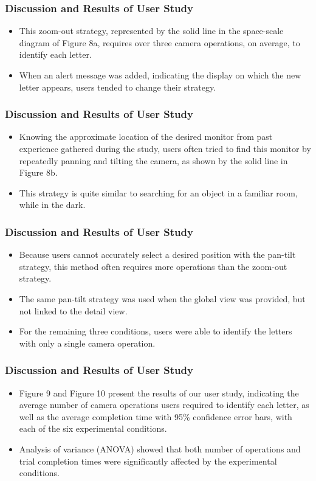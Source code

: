 \documentclass{beamer}
\begin{document}
\begin{frame}
\frametitle{Discussion and Results of User Study}

\begin{itemize}
\item This zoom-out strategy, represented by the solid line in the space-scale diagram  of Figure 8a, requires over three camera operations, on average, to identify each letter.
\item When an alert message was added, indicating the display on which the new letter appears, users tended to change their strategy.
\end{itemize}

\end{frame}

\begin{frame}
\frametitle{Discussion and Results of User Study}

\begin{itemize}
\item Knowing the approximate location of the desired monitor from past experience gathered during the study, users often tried to find this monitor by repeatedly panning and tilting the camera, as shown by the solid line in Figure 8b.
\item This strategy is quite similar to searching for an object in a familiar room, while in the dark.
\end{itemize}

\end{frame}

\begin{frame}
\frametitle{Discussion and Results of User Study}

\begin{itemize}
\item Because users cannot accurately select a desired position with the pan-tilt strategy, this method often requires more operations than the zoom-out strategy.
\item The same pan-tilt strategy was used when the global view was provided, but not linked to the detail view.
\item For the remaining three conditions, users were able to identify the letters with only a single camera operation.
\end{itemize}

\end{frame}

\begin{frame}
\frametitle{Discussion and Results of User Study}

\begin{itemize}
\item Figure 9 and Figure 10 present the results of our user study, indicating the average number of camera operations users required to identify each letter, as well as the average completion time with 95\% confidence error bars, with each of the six experimental conditions.
\item Analysis of variance (ANOVA) showed that both number of operations and trial completion times were significantly affected by the experimental conditions.
\end{itemize}

\end{frame}
\end{document}
